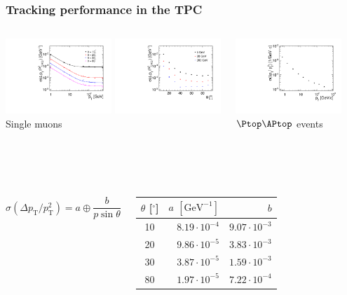 \documentclass{beamer}
\begin{document}
\begin{frame}
\frametitle{Tracking performance in the TPC}
\begin{columns}[c]
\column{8cm}
\begin{center}
\includegraphics[width=4cm]{CDRStyle_SingleMuons_MomRes_Vs_PT.pdf}
\includegraphics[width=4cm]{CDRStyle_SingleMuons_MomRes_Vs_Theta.pdf}\\
Single muons
\end{center}
\column{4cm}
\begin{center}
\includegraphics[width=4cm]{pt_resolution_ttbar_LDC_CDR.pdf}\\
$\Ptop\APtop$ events
\end{center}
\end{columns}
~\\
~\\
\begin{columns}[c]
\column{5cm}
\begin{displaymath}
\sigma(\Delta p_{\textrm{T}}/p_{\textrm{T}}^2) = a \oplus \frac{b}{p\sin\theta}
\end{displaymath}
\column{5cm}
\begin{tabular}{c r r}
\toprule
  $\theta$ \footnotesize{[$^{\circ}$]} & $a$
  \footnotesize{$[\mathrm{GeV}^{-1}]$} & $b$ \\\midrule 
  10 & $8.19\cdot10^{-4}$ & $9.07\cdot10^{-3}$ \\
        20 & $9.86\cdot10^{-5}$ & $3.83\cdot10^{-3}$ \\
        30 & $3.87\cdot10^{-5}$ & $1.59\cdot10^{-3}$ \\
        80 & $1.97\cdot10^{-5}$ & $7.22\cdot10^{-4}$ \\\bottomrule
\end{tabular}
\end{columns}

\end{frame}
\end{document}
